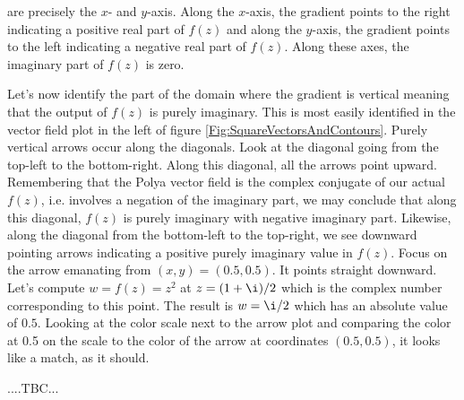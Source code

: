 \documentclass[12pt]{article}
\begin{document}
are precisely the $x$- and $y$-axis. Along the $x$-axis, the gradient points to the right indicating a positive real part of $f(z)$ and along the $y$-axis, the gradient points to the left indicating a negative real part of $f(z)$. Along these axes, the imaginary part of $f(z)$ is zero. 

\medskip
Let's now identify the part of the domain where the gradient is vertical meaning that the output of $f(z)$ is purely imaginary. This is most easily identified in the vector field plot in the left of figure \ref{Fig:SquareVectorsAndContours}. Purely vertical arrows occur along the diagonals. Look at the diagonal going from the top-left to the bottom-right. Along this diagonal, all the arrows point upward. Remembering that the Polya vector field is the complex conjugate of our actual $f(z)$, i.e. involves a negation of the imaginary part, we may conclude that along this diagonal, $f(z)$ is purely imaginary with negative imaginary part. Likewise, along the diagonal from the bottom-left to the top-right, we see downward pointing arrows indicating a positive purely imaginary value in $f(z)$. Focus on the arrow emanating from $(x,y) = (0.5,0.5)$. It points straight downward. Let's compute $w = f(z) = z^2$ at $z = (1 + \i) / 2$ which is the complex number corresponding to this point. The result is $w = \i / 2$ which has an absolute value of $0.5$. Looking at the color scale next to the arrow plot and comparing the color at 0.5 on the scale to the color of the arrow at coordinates $(0.5,0.5)$, it looks like a match, as it should.

....TBC...
\end{document}
